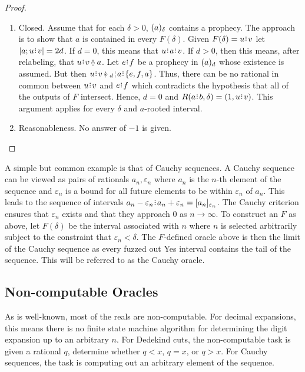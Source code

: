 \documentclass[12pt]{article}
\begin{document}
\begin{proof}
\begin{enumerate}
    \item Closed. Assume that for each $\delta > 0$, $\halo{a}$ contains a prophecy. The approach is to show that $a$ is contained in every $F(\delta)$. Given $F(\delta) = u\rint v$ let  $|a; u\rint v| = 2d$. If $d = 0$, this means that $u\rint a\rint v$. If $ d > 0$, then this means, after relabeling, that $u\rint v\betneq a$. Let $e\rint f$ be a prophecy in $\halo[d]{a}$ whose existence is assumed. But then $u\rint v \betneq \fuzbleft[d]{a} \rint  \{e, f, a\}$. Thus, there can be no rational in common between $u\rint v$ and $e\rint f$ which contradicts the hypothesis that all of the outputs of $F$ intersect. Hence, $d =0$ and $R(a\rint b, \delta) = (1, u\rint v)$. This argument applies for every $\delta$ and $a$-rooted interval. 
    
    \item Reasonableness. No answer of $-1$ is given. 
\end{enumerate}

\end{proof}



A simple but common example is that of Cauchy sequences. A Cauchy sequence can be viewed as pairs of rationals $a_n, \varepsilon_n$ where $a_n$ is the $n$-th element of the sequence and $\varepsilon_n$ is a bound for all future elements to be within $\varepsilon_n$ of $a_n$. This leads to the sequence of intervals $a_n-\varepsilon_n\rint a_n+\varepsilon_n = \clhalo[ \varepsilon_n]{a_n}$. The Cauchy criterion ensures that $\varepsilon_n$ exists and that they approach $0$ as $n \to \infty$. To construct an $F$ as above, let $F(\delta)$ be the interval associated with $n$ where $n$  is selected arbitrarily subject to the constraint that $\varepsilon_n < \delta$. The $F$-defined oracle above is then the limit of the Cauchy sequence as every fuzzed out Yes interval contains the tail of the sequence. This will be referred to as the Cauchy oracle. 
 

\subsection{Non-computable Oracles}

As is well-known, most of the reals are non-computable. For decimal expansions, this means there is no finite state machine algorithm for determining the digit expansion up to an arbitrary $n$. For Dedekind cuts, the non-computable task is given a rational $q$, determine whether $q < x$, $q = x$, or $q > x$. For Cauchy sequences, the task is computing out an arbitrary element of the sequence. 
\end{document}
